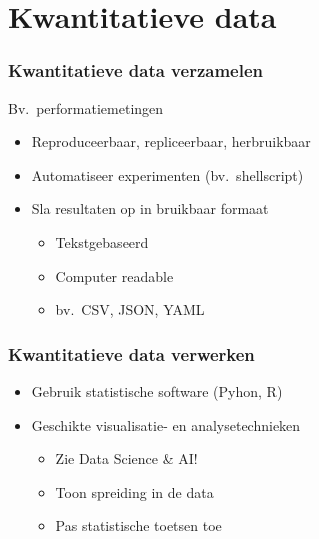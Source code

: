 \documentclass[aspectratio=169]{beamer}
\begin{document}
\section{Kwantitatieve data}

\begin{frame}
  \frametitle{Kwantitatieve data verzamelen}

  Bv.\ performatiemetingen

  \begin{itemize}
    \item Reproduceerbaar, repliceerbaar, herbruikbaar
    \item Automatiseer experimenten (bv.\ shellscript)
    \item Sla resultaten op in bruikbaar formaat
      \begin{itemize}
        \item Tekstgebaseerd
        \item Computer readable
        \item bv.\ CSV, JSON, YAML
      \end{itemize}
  \end{itemize}

\end{frame}

\begin{frame}
  \frametitle{Kwantitatieve data verwerken}

  \begin{itemize}
    \item Gebruik statistische software (Pyhon, R)
    \item Geschikte visualisatie- en analysetechnieken
      \begin{itemize}
        \item Zie Data Science \& AI!
        \item Toon spreiding in de data
        \item Pas statistische toetsen toe
      \end{itemize}
  \end{itemize}

\end{frame}
  
\end{document}
